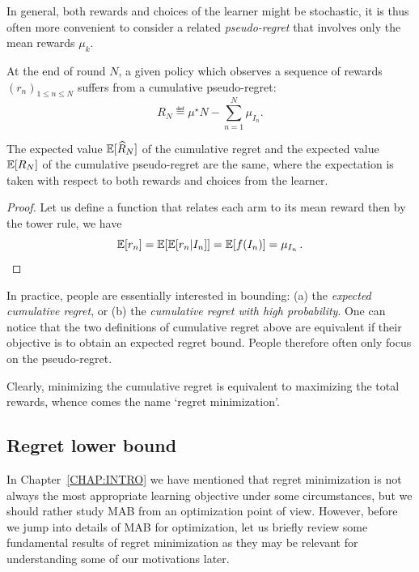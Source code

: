 In general, both rewards and choices of the learner might be stochastic, it is thus often more convenient to consider a related \emph{pseudo-regret} that involves only the mean rewards $\mu_k$.

\begin{definition}\label{def:mab.pseudo_regret}
\begin{leftbar}[defnbar]
	At the end of round $N$, a given policy which observes a sequence of rewards $(r_n)_{1 \leq n \leq N}$ suffers from a cumulative pseudo-regret:
	\[
		R_N \eqdef \mu^{\star}N - \sum_{n=1}^N \mu_{I_n}.
	\]
\end{leftbar}
\end{definition}

\begin{proposition}\label{prop:mab.pseudo_regret}
\begin{leftbar}[propositionbar]
	The expected value $\mathbb{E}[\widehat{R}_N]$ of the cumulative regret and the expected value $\mathbb{E}[R_N]$ of the cumulative pseudo-regret are the same, where the expectation is taken with respect to both rewards and choices from the learner.
\end{leftbar}
\end{proposition}

\begin{proof}
	Let us define a function that relates each arm to its mean reward  then by the tower rule, we have
    \[
	    \mathbb{E}[r_n] = \mathbb{E}[\mathbb{E}[r_n|I_n]] = \mathbb{E}[f(I_n)] = \mu_{I_n}\,.
    \]
\end{proof}

In practice, people are essentially interested in bounding: (a) the \emph{expected cumulative regret}, or (b) the \emph{cumulative regret with high probability}. One can notice that the two definitions of cumulative regret above are equivalent if their objective is to obtain an expected regret bound. People therefore often only focus on the pseudo-regret.

Clearly, minimizing the cumulative regret is equivalent to maximizing the total rewards, whence comes the name `regret minimization'. 

\subsection{Regret lower bound}\label{sec:mab.model.lb}

In Chapter~\ref{CHAP:INTRO} we have mentioned that regret minimization is not always the most appropriate learning objective under some circumstances, but we should rather study MAB from an optimization point of view. However, before we jump into details of MAB for optimization, let us briefly review some fundamental results of regret minimization as they may be relevant for understanding some of our motivations later.

